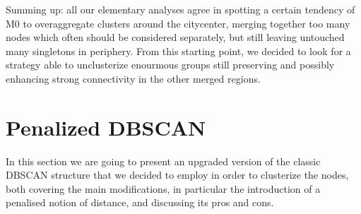\documentclass[11pt,twoside]{report}
\begin{document}
Summing up: all our elementary analyses agree in spotting a certain tendency of M0 to overaggregate clusters around the citycenter, merging together too many nodes which often should be considered separately, but still leaving untouched many singletons in periphery.
From this starting point, we decided to look for a strategy able to unclusterize enourmous groups still preserving and possibly enhancing strong connectivity in the other merged regions.

\section{Penalized DBSCAN}
In this section we are going to present an upgraded version of the classic DBSCAN structure that we decided to employ in order to clusterize the nodes, both covering the main modifications, in particular the introduction of a penalised notion of distance, and discussing its pros and cons.
\end{document}
